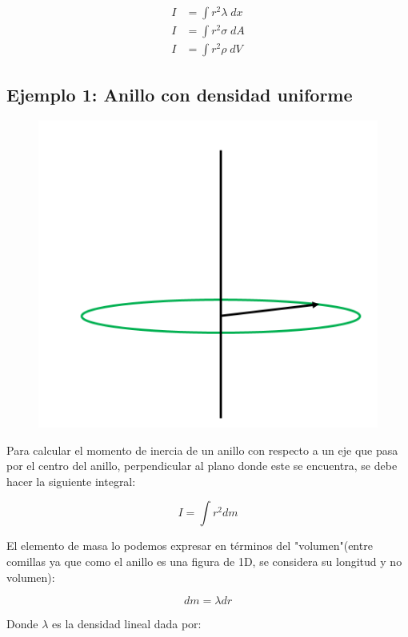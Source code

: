 \documentclass[a4paper,11pt]{article}
\begin{document}
\begin{subequations}
	\begin{align}
	I &=  \int r^2 \lambda \;dx  \\
	I &=  \int r^2 \sigma \;dA \\
	I &=  \int r^2 \rho\; dV 
	\end{align}
\end{subequations}


\subsection{Ejemplo 1: Anillo con densidad uniforme}


\begin{figure}
	\includegraphics[scale=0.5]{./im/anillo1}
\end{figure}
Para calcular el momento de inercia de un anillo con respecto a un eje que pasa por el centro del anillo, perpendicular al plano donde este se encuentra, se debe hacer la siguiente integral:

$$ I = \int r^2 dm$$

El elemento de masa lo podemos expresar en términos del "volumen"(entre comillas ya que como el anillo es una figura de 1D, se considera su longitud y no volumen):

$$ dm = \lambda dr $$

Donde $\lambda$ es la densidad lineal dada por:
\end{document}
